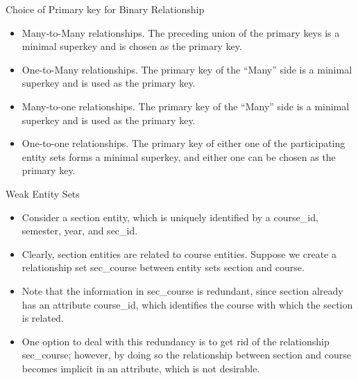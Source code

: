 \documentclass{beamer}
\begin{document}
\begin{frame}{Choice of Primary key for Binary Relationship}
    \begin{itemize}
        \item Many-to-Many relationships. The preceding union of the primary keys is a minimal superkey and is chosen as the primary key.
        \item One-to-Many relationships. The primary key of the ``Many'' side is a minimal superkey and is used as the primary key.
        \item Many-to-one relationships. The primary key of the ``Many'' side is a minimal superkey and is used as the primary key.
        \item One-to-one relationships. The primary key of either one of the participating entity sets forms a minimal superkey, and either one can be chosen as the primary key.
    \end{itemize}
\end{frame}

\begin{frame}{Weak Entity Sets}
    \begin{itemize}
        \item Consider a section entity, which is uniquely identified by a course\_id, semester, year, and sec\_id.
        \item Clearly, section entities are related to course entities. Suppose we create a relationship set sec\_course between entity sets section and course.
        \item Note that the information in sec\_course is redundant, since section already has an attribute course\_id, which identifies the course with which the section is related.
        \item One option to deal with this redundancy is to get rid of the relationship sec\_course; however, by doing so the relationship between section and course becomes implicit in an attribute, which is not desirable.
    \end{itemize}
\end{frame}
\end{document}
